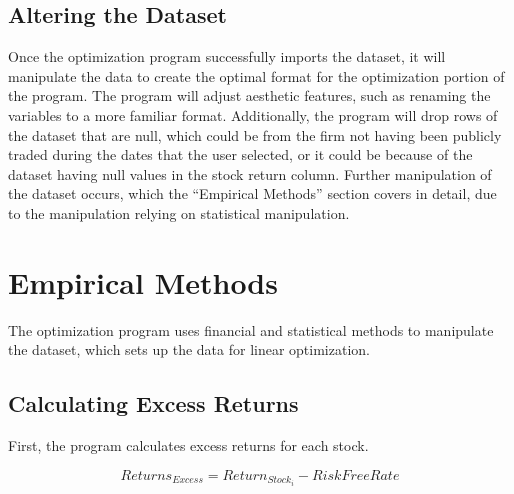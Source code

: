 \documentclass[12pt,english]{article}
\begin{document}
\begin{doublespace}
        \subsection{Altering the Dataset}
        \indent{}\indent{}
        Once the optimization program successfully imports the dataset, it will manipulate the data to create the optimal format for the optimization portion of the program. The program will adjust aesthetic features, such as renaming the variables to a more familiar format. Additionally, the program will drop rows of the dataset that are null, which could be from the firm not having been publicly traded during the dates that the user selected, or it could be because of the dataset having null values in the stock return column. Further manipulation of the dataset occurs, which the “Empirical Methods” section covers in detail, due to the manipulation relying on statistical manipulation.


    \section{Empirical Methods}\label{sec:methods}\indent{}\indent{} %
    
        The optimization program uses financial and statistical methods to manipulate the dataset, which sets up the data for linear optimization. 
        
        \subsection{Calculating Excess Returns}
        
    	    First, the program calculates excess returns for each stock.
                \begin{center}
                    \begin{equation} \label{Excess Returns}
                        Returns_{Excess} = Return_{Stock_{i}} - RiskFreeRate
                    \end{equation}
                \end{center}


\end{doublespace}
\end{document}
